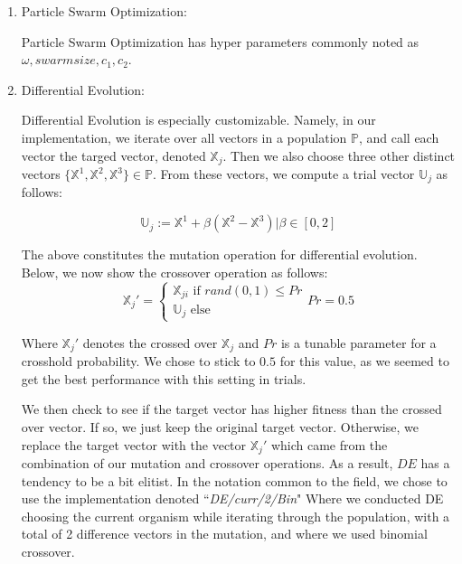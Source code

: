 \documentclass[twoside,11pt]{article}
\begin{document}
\begin{enumerate}
\item Particle Swarm Optimization:

	Particle Swarm Optimization has hyper parameters commonly noted as $\omega, swarmsize, c_1, c_2$.

\item Differential Evolution:

	Differential Evolution is especially customizable. Namely, in our implementation, we iterate over all vectors in a population $\mathbb{P}$, and call each vector
		the targed vector, denoted $\mathbb{X}_j$. Then we also choose three other distinct vectors $\{\mathbb{X}^1, \mathbb{X}^2, \mathbb{X}^3\}\in \mathbb{P}$.
		From these vectors, we compute a trial vector $\mathbb{U}_j$ as follows:

		\begin{equation}
			\mathbb{U}_j := \mathbb{X}^1 + \beta(\mathbb{X}^2 - \mathbb{X}^3) | \beta \in [0,2]
		\end{equation}

		The above constitutes the mutation operation for differential evolution. Below, we now show the crossover operation as follows:
		\begin{equation}
		\mathbb{X}_j'=
		\begin{cases}
			\mathbb{X}_{ji} \text{ if } rand(0,1)\leq Pr \\
			\mathbb{U}_j \text{ else}
		\end{cases}
		Pr = 0.5
		\end{equation}

		Where $\mathbb{X}_j'$ denotes the crossed over $\mathbb{X}_j$ and $Pr$ is a tunable parameter for a crosshold probability. We chose to stick to $0.5$ for this
		value, as we seemed to get the best performance with this setting in trials.

		We then check to see if the target vector has higher fitness than the crossed over vector. If so, we just keep the original target vector. Otherwise, we replace
		the target vector with the vector $\mathbb{X}_j'$ which came from the combination of our mutation and crossover operations. As a result, $DE$ has a tendency to
		be a bit elitist. In the notation common to the field, we chose to use the implementation denoted ``\textit{DE/curr/2/Bin}" Where we conducted DE choosing the 
		current organism while iterating through the population, with a total of 2 difference vectors in the mutation, and where we used binomial crossover. 
\end{enumerate}
\end{document}
